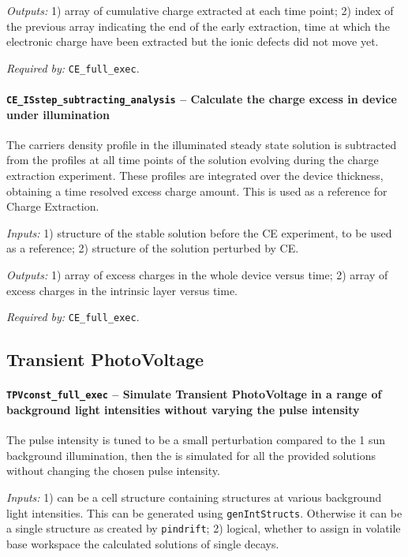 		\textit{Outputs:} 1) array of cumulative charge extracted at each time point;
		2) index of the previous array indicating the end of the early extraction, time at which the electronic charge have been extracted but the ionic defects did not move yet.


		\textit{Required by:} \texttt{CE\_full\_exec}.

		\paragraph{\texttt{CE\_ISstep\_subtracting\_analysis} -- Calculate the charge excess in device under illumination}
		The carriers density profile in the illuminated steady state solution is subtracted from the profiles
		at all time points of the solution evolving during the charge extraction experiment.
		These profiles are integrated over the device thickness, obtaining a time resolved excess charge amount.
		This is used as a reference for Charge Extraction.

		\textit{Inputs:} 1) structure of the stable solution before the CE experiment, to be used as a reference;
		2) structure of the solution perturbed by CE.

		\textit{Outputs:} 1) array of excess charges in the whole device versus time;
		2) array of excess charges in the intrinsic layer versus time.

		\textit{Required by:} \texttt{CE\_full\_exec}.


	\subsection{Transient PhotoVoltage}\label{dd_tpv}

		\paragraph{\texttt{TPV\-const\_full\_exec} -- Simulate Transient PhotoVoltage in a range of background light intensities without varying the pulse intensity}
		The pulse intensity is tuned to be a small perturbation compared to the 1
		sun background illumination, then the  is simulated for all the
		provided solutions without changing the chosen pulse intensity.

		\textit{Inputs:} 1) can be a cell structure containing structures at various background
		light intensities. This can be generated using \texttt{gen\-Int\-Structs}.
		Otherwise it can be a single structure as created by \texttt{pin\-drift};
		2) logical, whether to assign in volatile base
		workspace the calculated solutions of single  decays.

